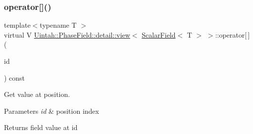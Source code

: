 \subsubsection{\texorpdfstring{operator[]()}{operator[]()}\hspace{0.1cm}{\footnotesize\ttfamily [2/2]}}
{\footnotesize\ttfamily template$<$typename T $>$ \\
virtual V \hyperlink{classUintah_1_1PhaseField_1_1detail_1_1view}{Uintah\+::\+Phase\+Field\+::detail\+::view}$<$ \hyperlink{structUintah_1_1PhaseField_1_1ScalarField}{Scalar\+Field}$<$ T $>$ $>$\+::operator\mbox{[}$\,$\mbox{]} (\begin{DoxyParamCaption}\item[{const Int\+Vector \&}]{id }\end{DoxyParamCaption}) const\hspace{0.3cm}{\ttfamily [pure virtual]}}



Get value at position. 


\begin{DoxyParams}{Parameters}
{\em id} & position index \\
\hline
\end{DoxyParams}
\begin{DoxyReturn}{Returns}
field value at id 
\end{DoxyReturn}


